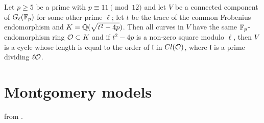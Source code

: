 \begin{theorem}\label{CSIDH_cycle}
    Let $p\ge 5$ be a prime with $p\equiv11\pmod{12}$ and let $V$ be a connected component of $G_\ell(\mathbb{F}_p)$ for some other prime $\ell$; let $t$ be the trace of the common Frobenius endomorphism and $K=\mathbb{Q}(\sqrt{t^2-4p})$. Then all curves in $V$ have the same $\mathbb{F}_p$-endomorphism ring $\mathcal{O}\subset K$ and if $t^2-4p$ is a non-zero square modulo $\ell$, then $V$ is a cycle whose length is equal to the order of $\mathfrak{l}$ in $Cl(\mathcal{O})$, where $\mathfrak{l}$ is a prime dividing $\ell\mathcal{O}$.
\end{theorem}

\section{Montgomery models}
\cite{Costello_Montgomery} from \cite{Montgomery_curve}.

